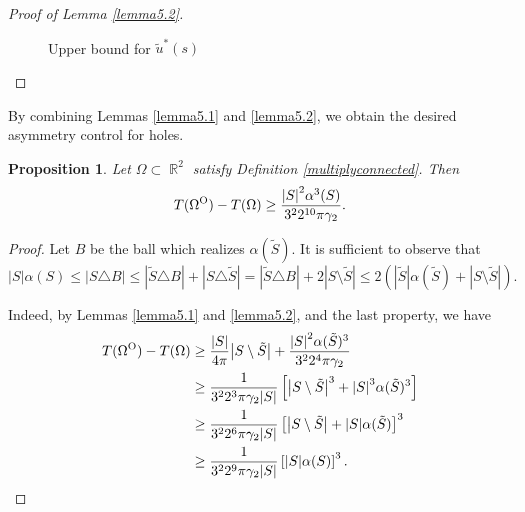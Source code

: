 \documentclass[oneside,a4paper,11pt,notitlepage]{article}
\newcommand{\abs}[1]{{\left|#1\right|}}
\theoremstyle{definition}
\theoremstyle{plain}
\newtheorem{prop}[theorem]{Proposition}
\theoremstyle{definition}
\DeclareMathOperator{\R}{\mathbb{R}}
\newcommand{\OO}{\text{\normalfont  O}}
\begin{document}
\begin{proof}[Proof of Lemma \ref{lemma5.2}]
\begin{figure}[ht!]
\caption{Upper bound for $\tilde u^\ast(s)$}
        \label{fig:funzionef}
    \end{figure}
\end{proof}


By combining Lemmas \ref{lemma5.1} and \ref{lemma5.2}, we obtain the desired asymmetry control for holes.

\begin{prop}\label{prop5.5}
	Let $\Omega\subset\R^2$ satisfy Definition \ref{multiplyconnected}. Then 
	\begin{equation*}
	T(\Omega^\OO)-T(\Omega) \geq \frac{\abs{S}^2\alpha^3(S)}{3^22^{10}\pi \gamma_ 2}.
	\end{equation*}
\end{prop}

\begin{proof}
	Let $B$ be the ball which realizes $\alpha(\tilde{ S})$. It is sufficient to observe that 
	$$
	\abs{S}  \alpha(S)\leq \abs{S\triangle B}\leq \abs{\tilde{ S}\triangle B} + \abs{S\triangle \tilde{ S}}	= \abs{\tilde{ S}\triangle B} + 2 \abs{S\setminus \tilde{ S}} \leq 2\left(\abs{\tilde{ S}} \alpha(\tilde{ S})+ \abs{S\setminus \tilde{ S}}\right).$$

    Indeed, by Lemmas \ref{lemma5.1} and \ref{lemma5.2}, and the last property, we have
    \begin{equation*}
        \begin{aligned}
           	T(\Omega^\OO)-T(\Omega) &\geq \frac{\abs{S}}{4\pi}\abs{S\setminus\tilde{S}} +\frac{\abs{S}^2\alpha(\tilde{S})^3}{3^22^4\pi \gamma_ 2} \\
        &\geq \frac{1}{3^22^3\pi \gamma_ 2 \abs{S}}  \left[\abs{S\setminus\tilde{S}}^3 +\abs{S}^3\alpha(\tilde{S})^3\right]\\
         &\geq \frac{1}{3^22^6\pi \gamma_ 2 \abs{S}}  \left[\abs{S\setminus\tilde{S}}+\abs{S}\alpha(\tilde{S})\right]^3\\
         &\geq \frac{1}{3^22^{9}\pi \gamma_ 2 \abs{S}}  \left[\abs{S}\alpha(S)\right]^3.
        \end{aligned}
    \end{equation*}
	\end{proof}
\end{document}
